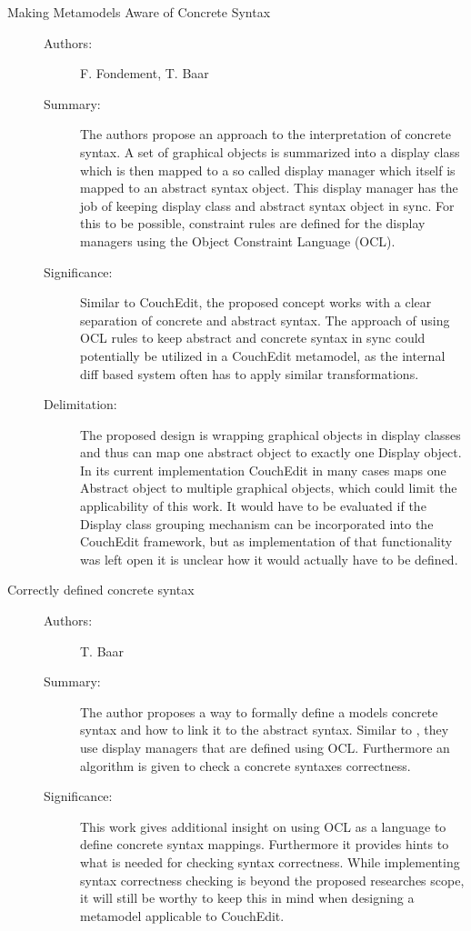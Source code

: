 \documentclass[10pt,a4paper,oneside]{scrartcl}
\begin{document}
\begin{description}
\begin{description}
        \end{description}

  \item[Making Metamodels Aware of Concrete Syntax] \cite{fondement_making_2005}
        \begin{description}
          \item[Authors:] F. Fondement, T. Baar
          \item[Summary:] The authors propose an approach to the interpretation of concrete syntax. A set of graphical objects is summarized into a display class which is then mapped to a so called display manager which itself is mapped to an abstract syntax object. This display manager has the job of keeping display class and abstract syntax object in sync. For this to be possible, constraint rules are defined for the display managers using the Object Constraint Language (OCL).
          \item[Significance:] Similar to CouchEdit, the proposed concept works with a clear separation of concrete and abstract syntax. The approach of using OCL rules to keep abstract and concrete syntax in sync could potentially be utilized in a CouchEdit metamodel, as the internal diff based system often has to apply similar transformations.
          \item[Delimitation:] The proposed design is wrapping graphical objects in display classes and thus can map one abstract object to exactly one Display object. In its current implementation CouchEdit in many cases maps one Abstract object to multiple graphical objects, which could limit the applicability of this work. It would have to be evaluated if the Display class grouping mechanism can be incorporated into the CouchEdit framework, but as implementation of that functionality was left open it is unclear how it would actually have to be defined.
        \end{description}

  \item[Correctly defined concrete syntax] \cite{baar_correctly_2008}
        \begin{description}
          \item[Authors:] T. Baar
          \item[Summary:] The author proposes a way to formally define a models concrete syntax and how to link it to the abstract syntax. Similar to \cite{fondement_making_2005}, they use display managers that are defined using OCL. Furthermore an algorithm is given to check a concrete syntaxes correctness.
          \item[Significance:] This work gives additional insight on using OCL as a language to define concrete syntax mappings. Furthermore it provides hints to what is needed for checking syntax correctness. While implementing syntax correctness checking is beyond the proposed researches scope, it will still be worthy to keep this in mind when designing a metamodel applicable to CouchEdit.
        \end{description}


\end{description}
\end{document}
